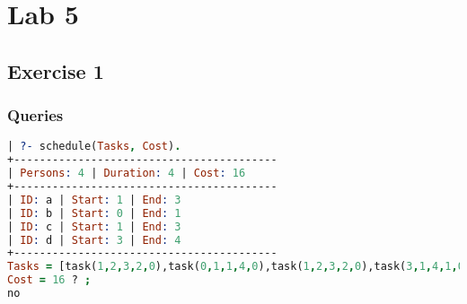 \section{Lab 5}
\subsection{Exercise 1}

\pagebreak
\subsubsection{Queries}
\begin{lstlisting}[language=Prolog]
| ?- schedule(Tasks, Cost).
+-----------------------------------------
| Persons: 4 | Duration: 4 | Cost: 16
+-----------------------------------------
| ID: a | Start: 1 | End: 3
| ID: b | Start: 0 | End: 1
| ID: c | Start: 1 | End: 3
| ID: d | Start: 3 | End: 4
+-----------------------------------------
Tasks = [task(1,2,3,2,0),task(0,1,1,4,0),task(1,2,3,2,0),task(3,1,4,1,0)],
Cost = 16 ? ;
no
\end{lstlisting}
